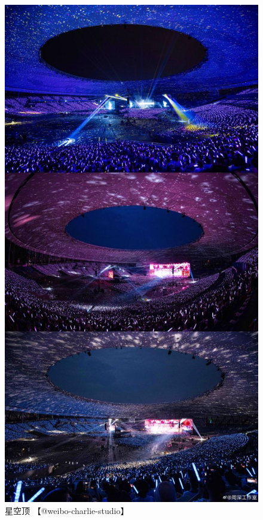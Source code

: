 \documentclass[]{ctexbook}
\begin{document}
\begin{figure}

{\centering \includegraphics[width=400pt]{img/chengdu20240615/003} 

}

\caption{星空顶 【@weibo-charlie-studio】}\label{fig:unnamed-chunk-51}
\end{figure}
\end{document}
